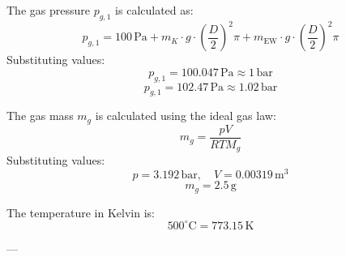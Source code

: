 The gas pressure \( p_{g,1} \) is calculated as:  
\[
p_{g,1} = 100 \, \text{Pa} + m_K \cdot g \cdot \left( \frac{D}{2} \right)^2 \pi + m_{\text{EW}} \cdot g \cdot \left( \frac{D}{2} \right)^2 \pi
\]  
Substituting values:  
\[
p_{g,1} = 100.047 \, \text{Pa} \approx 1 \, \text{bar}
\]  
\[
p_{g,1} = 102.47 \, \text{Pa} \approx 1.02 \, \text{bar}
\]  

The gas mass \( m_g \) is calculated using the ideal gas law:  
\[
m_g = \frac{p V}{R T M_g}
\]  
Substituting values:  
\[
p = 3.192 \, \text{bar}, \quad V = 0.00319 \, \text{m}^3
\]  
\[
m_g = 2.5 \, \text{g}
\]  

The temperature in Kelvin is:  
\[
500^\circ\text{C} = 773.15 \, \text{K}
\]  

---